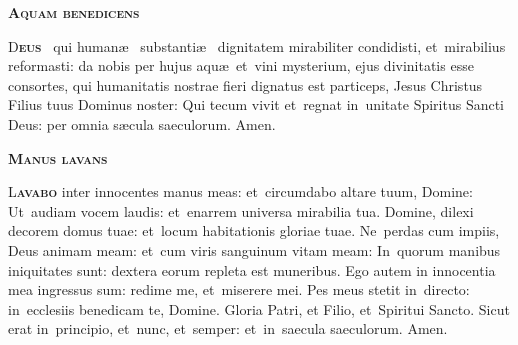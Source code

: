 \documentclass[first]{../altarcard}
\begin{document}
\begin{center}

	\begin{minipage}{0.7\linewidth}

		\vspace*{2.7cm}

		\begin{center}
			\scshape\bfseries\Huge
			Aquam benedicens
		\end{center}


		\huge

		\lettrine[lines=3]{\color{newred}D}{\bfseries\color{newred}eus}
		\cross~qui human\ae~ substanti\ae~ dignitatem mirabiliter condidisti,
		et~mirabilius reformasti: da nobis per hujus aqu\ae~et~vini mysterium,
		ejus divinitatis esse consortes, qui humanitatis nostrae fieri dignatus
		est particeps, Jesus Christus Filius tuus Dominus noster: Qui tecum
		vivit et~regnat in~unitate Spiritus Sancti Deus: per omnia s\ae cula
		saeculorum. \textcolor{newred}{Amen.}

		\vspace*{1.1cm}

		\centerline{
			\scshape\bfseries\Huge
			Manus lavans}

		\vspace*{0.1cm}

		\lettrine[lines=3]{\color{newred}L}{\bfseries\color{newred}avabo} inter
		innocentes manus meas: et~circumdabo altare tuum, Domine: Ut~audiam
		vocem laudis: et~enarrem universa mirabilia tua. Domine, dilexi decorem
		domus tuae: et~locum habitationis gloriae tuae. Ne~perdas cum impiis,
		Deus animam meam: et~cum viris sanguinum vitam meam: In~quorum manibus
		iniquitates sunt: dextera eorum repleta est muneribus. Ego autem in
		innocentia mea ingressus sum: redime me, et~miserere mei. Pes meus
		stetit in~directo: in~ecclesiis benedicam te, Domine. Gloria Patri, et
		Filio, et~Spiritui Sancto. Sicut erat in~principio, et~nunc, et~semper:
		et~in~saecula saeculorum. \textcolor{newred}{Amen.}
	\end{minipage}
\end{center}

\vspace*{1cm}
\end{document}
